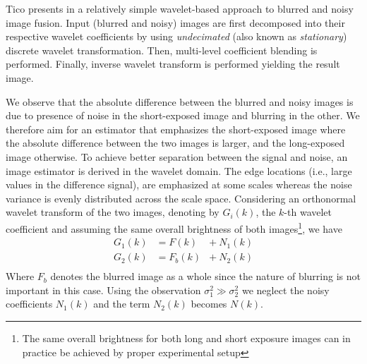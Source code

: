 \documentclass[12pt,notitlepage]{report}
\begin{document}
Tico presents in \cite{tico09} a relatively simple wavelet-based approach to blurred and noisy image fusion. Input (blurred and noisy) images are first decomposed into their respective wavelet coefficients by using  {\em undecimated} (also known as {\em stationary}) discrete wavelet transformation. Then, multi-level coefficient blending is performed. Finally, inverse wavelet transform is performed yielding the result image.

We observe that the absolute difference between the blurred and noisy images is due to presence of noise in the short-exposed image and blurring in the other. We therefore aim for an estimator that emphasizes the short-exposed image where the absolute difference between the two images is larger, and the long-exposed image otherwise. To achieve better separation between the signal and noise, an image estimator is derived in the wavelet domain. The edge locations (i.e., large values in the difference signal), are emphasized at some scales whereas the noise variance is evenly distributed across the scale space. Considering an orthonormal wavelet transform of the two images, denoting by $G_i(k)$, the $k$-th wavelet coefficient and assuming the same overall brightness of both images\footnote[4]{The same overall brightness for both long and short exposure images can in practice be achieved by proper experimental setup}, we have
\begin{equation}
	\label{eq:tico09_model}
	\begin{aligned}
		G_1(k) &= F(k) &+ \ N_1(k) \\
		G_2(k) &= F_b(k) &+ \ N_2(k) \\
	\end{aligned}
\end{equation}
Where $F_b$ denotes the blurred image as a whole since the nature of blurring is not important in this case. Using the observation $\sigma_1^2 \gg \sigma_2^2$ we neglect the noisy coefficients $N_1(k)$ and the term $N_2(k)$ becomes $N(k)$.
\end{document}

